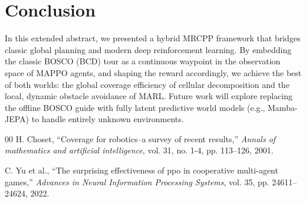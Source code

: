 \documentclass[conference]{IEEEtran}
\begin{document}
\section{Conclusion}
In this extended abstract, we presented a hybrid MRCPP framework that bridges classic global planning and modern deep reinforcement learning. By embedding the classic BOSCO (BCD) tour as a continuous waypoint in the observation space of MAPPO agents, and shaping the reward accordingly, we achieve the best of both worlds: the global coverage efficiency of cellular decomposition and the local, dynamic obstacle avoidance of MARL. Future work will explore replacing the offline BOSCO guide with fully latent predictive world models (e.g., Mamba-JEPA) to handle entirely unknown environments.


\begin{thebibliography}{00}
H. Choset, ``Coverage for robotics--a survey of recent results,'' \emph{Annals of mathematics and artificial intelligence}, vol. 31, no. 1-4, pp. 113--126, 2001.

C. Yu et al., ``The surprising effectiveness of ppo in cooperative multi-agent games,'' \emph{Advances in Neural Information Processing Systems}, vol. 35, pp. 24611--24624, 2022.
\end{thebibliography}
\end{document}
